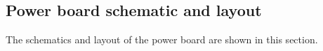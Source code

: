\newpage
\begin{hugepage}
\section{Power board schematic and layout}
\label{app:power_board}
The schematics and layout of the power board are shown in this section.\\

\pdfpagewidth
\begin{figure}
\centering


\end{figure}
\end{hugepage}
\newpage